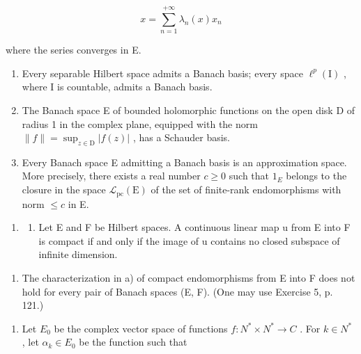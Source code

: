 \[
x = \sum_ {n = 1} ^ {+ \infty} \lambda_ {n} (x) x _ {n}
\]

where the series converges in E.

\begin{enumerate}
\def\labelenumi{\alph{enumi})}
\item
  Every separable Hilbert space admits a Banach basis; every space \(\ell^{p}(\mathrm{I})\) , where I is countable, admits a Banach basis.
\item
  The Banach space E of bounded holomorphic functions on the open disk D of radius 1 in the complex plane, equipped with the norm \(\| f \| = \sup_{z \in \mathrm{D}} |f(z)|\) , has a Schauder basis.
\item
  Every Banach space E admitting a Banach basis is an approximation space. More precisely, there exists a real number \(c \geqslant 0\) such that \(1_{E}\) belongs to the closure in the space \(\mathcal{L}_{\mathrm{pc}}(\mathrm{E})\) of the set of finite-rank endomorphisms with norm \(\leqslant c\) in E.
\end{enumerate}

\begin{enumerate}
\def\labelenumi{\arabic{enumi})}
\setcounter{enumi}{13}
\tightlist
\item
  \begin{enumerate}
  \def\labelenumii{\alph{enumii})}
  \tightlist
  \item
    Let E and F be Hilbert spaces. A continuous linear map u from E into F is compact if and only if the image of u contains no closed subspace of infinite dimension.
  \end{enumerate}
\end{enumerate}

\begin{enumerate}
\def\labelenumi{\alph{enumi})}
\setcounter{enumi}{1}
\tightlist
\item
  The characterization in a) of compact endomorphisms from E into F does not hold for every pair of Banach spaces (E, F). (One may use Exercise 5, p. 121.)
\end{enumerate}

\begin{enumerate}
\def\labelenumi{\arabic{enumi})}
\setcounter{enumi}{14}
\tightlist
\item
  Let \(E_{0}\) be the complex vector space of functions \(f: N^{*} \times N^{*} \to C\) . For \(k \in N^{*}\) , let \(\alpha_{k} \in E_{0}\) be the function such that
\end{enumerate}


